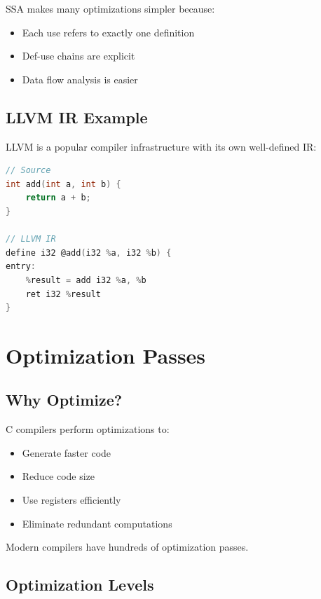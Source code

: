 SSA makes many optimizations simpler because:
\begin{itemize}
    \item Each use refers to exactly one definition
    \item Def-use chains are explicit
    \item Data flow analysis is easier
\end{itemize}

\subsection{LLVM IR Example}

LLVM is a popular compiler infrastructure with its own well-defined IR:

\begin{lstlisting}[language=C]
// Source
int add(int a, int b) {
    return a + b;
}

// LLVM IR
define i32 @add(i32 %a, i32 %b) {
entry:
    %result = add i32 %a, %b
    ret i32 %result
}
\end{lstlisting}

\section{Optimization Passes}

\subsection{Why Optimize?}

C compilers perform optimizations to:
\begin{itemize}
    \item Generate faster code
    \item Reduce code size
    \item Use registers efficiently
    \item Eliminate redundant computations
\end{itemize}

Modern compilers have hundreds of optimization passes.

\subsection{Optimization Levels}

